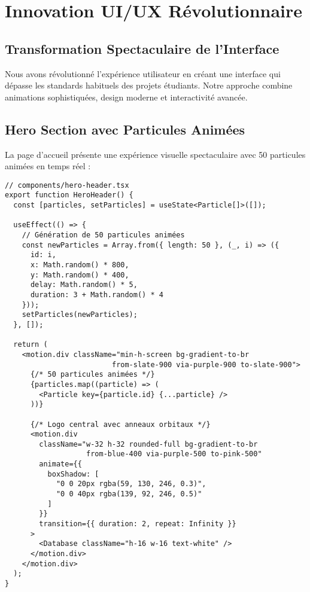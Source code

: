 \documentclass[12pt,a4paper]{report}
\begin{document}
\chapter{Innovation UI/UX Révolutionnaire}

\section{Transformation Spectaculaire de l'Interface}

Nous avons révolutionné l'expérience utilisateur en créant une interface qui dépasse les standards habituels des projets étudiants. Notre approche combine animations sophistiquées, design moderne et interactivité avancée.

\section{Hero Section avec Particules Animées}

La page d'accueil présente une expérience visuelle spectaculaire avec 50 particules animées en temps réel :

\begin{lstlisting}[caption=Génération de particules animées]
// components/hero-header.tsx
export function HeroHeader() {
  const [particles, setParticles] = useState<Particle[]>([]);

  useEffect(() => {
    // Génération de 50 particules animées
    const newParticles = Array.from({ length: 50 }, (_, i) => ({
      id: i,
      x: Math.random() * 800,
      y: Math.random() * 400,
      delay: Math.random() * 5,
      duration: 3 + Math.random() * 4
    }));
    setParticles(newParticles);
  }, []);

  return (
    <motion.div className="min-h-screen bg-gradient-to-br 
                         from-slate-900 via-purple-900 to-slate-900">
      {/* 50 particules animées */}
      {particles.map((particle) => (
        <Particle key={particle.id} {...particle} />
      ))}
      
      {/* Logo central avec anneaux orbitaux */}
      <motion.div
        className="w-32 h-32 rounded-full bg-gradient-to-br 
                   from-blue-400 via-purple-500 to-pink-500"
        animate={{ 
          boxShadow: [
            "0 0 20px rgba(59, 130, 246, 0.3)", 
            "0 0 40px rgba(139, 92, 246, 0.5)"
          ] 
        }}
        transition={{ duration: 2, repeat: Infinity }}
      >
        <Database className="h-16 w-16 text-white" />
      </motion.div>
    </motion.div>
  );
}
\end{lstlisting}
\end{document}
